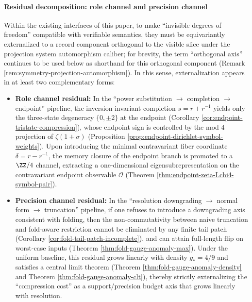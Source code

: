 \paragraph{Residual decomposition: role channel and precision channel}
Within the existing interfaces of this paper, to make ``invisible degrees of freedom'' compatible with verifiable semantics, they must be equivariantly externalized to a record component orthogonal to the visible slice under the projection system automorphism caliber; for brevity, the term ``orthogonal axis'' continues to be used below as shorthand for this orthogonal component (Remark \ref{rem:symmetry-projection-automorphism}). In this sense, externalization appears in at least two complementary forms:
\begin{itemize}
  \item \textbf{Role channel residual:} In the ``power substitution \(\to\) completion \(\to\) endpoint'' pipeline, the inversion-invariant completion \(s=r+r^{-1}\) yields only the three-state degeneracy \(\{0,\pm 2\}\) at the endpoint (Corollary \ref{cor:endpoint-tristate-compression}), whose endpoint sign is controlled by the mod \(4\) projection of \(\zeta(1+\sigma)\) (Proposition \ref{prop:endpoint-dirichlet-symbol-weights}). Upon introducing the minimal contravariant fiber coordinate \(\delta=r-r^{-1}\), the memory closure of the endpoint branch is promoted to a \(\ZZ/4\) channel, extracting a one-dimensional eigensubrepresentation on the contravariant endpoint observable \(\mathcal O\) (Theorem \ref{thm:endpoint-zeta-Lchi4-symbol-pair}).
  \item \textbf{Precision channel residual:} In the ``resolution downgrading \(\to\) normal form \(\to\) truncation'' pipeline, if one refuses to introduce a downgrading axis consistent with folding, then the non-commutativity between naive truncation and fold-aware restriction cannot be eliminated by any finite tail patch (Corollary \ref{cor:fold-tail-patch-incomplete}), and can attain full-length flip on worst-case inputs (Theorem \ref{thm:fold-gauge-anomaly-max}). Under the uniform baseline, this residual grows linearly with density \(g_\ast=4/9\) and satisfies a central limit theorem (Theorem \ref{thm:fold-gauge-anomaly-density} and Theorem \ref{thm:fold-gauge-anomaly-clt}), thereby strictly externalizing the ``compression cost'' as a support/precision budget axis that grows linearly with resolution.
\end{itemize}
